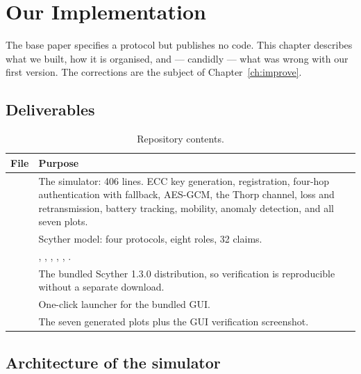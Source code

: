 \chapter{Our Implementation}
\label{ch:impl}

The base paper specifies a protocol but publishes no code. This chapter describes what we
built, how it is organised, and --- candidly --- what was wrong with our first version. The
corrections are the subject of Chapter~\ref{ch:improve}.

\section{Deliverables}

\begin{table}[H]
\centering
\caption{Repository contents.}
\label{tab:repo}
\small
\begin{tabularx}{\textwidth}{@{}L{46mm} X@{}}
\toprule
\textbf{File} & \textbf{Purpose}\\
\midrule
{} & The simulator: 406 lines. ECC key generation, registration,
  four-hop authentication with fallback, AES-GCM, the Thorp channel, loss and
  retransmission, battery tracking, mobility, anomaly detection, and all seven plots.\\
 & Scyther model: four protocols, eight roles, 32 claims.\\
 & , , ,
  , , .\\
 & The bundled Scyther 1.3.0 distribution, so verification is reproducible
  without a separate download.\\
 & One-click launcher for the bundled GUI.\\
 & The seven generated plots plus the GUI verification screenshot.\\
\bottomrule
\end{tabularx}
\end{table}

\section{Architecture of the simulator}

